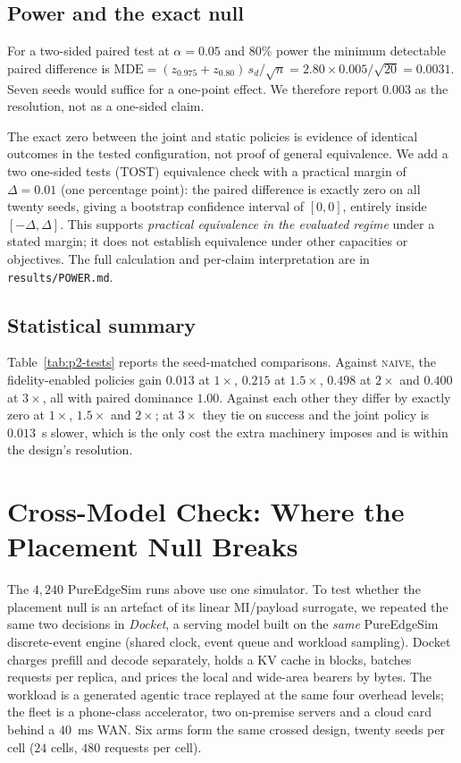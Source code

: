 \documentclass[journal,10pt]{IEEEtran}
\begin{document}


\subsection{Power and the exact null}
\label{sec:power}
For a two-sided paired test at $\alpha=0.05$ and $80\%$ power the minimum
detectable paired difference is
$\mathrm{MDE}=(z_{0.975}+z_{0.80})\,s_d/\sqrt{n}
=2.80\times0.005/\sqrt{20}=0.0031$. Seven seeds would suffice for a one-point
effect. We therefore report $0.003$ as the resolution, not as a one-sided claim.

The exact zero between the joint and static policies is evidence of identical
outcomes in the tested configuration, not proof of general equivalence. We add a
two one-sided tests (TOST) equivalence check with a practical margin of
$\Delta=0.01$ (one percentage point): the paired difference is exactly zero on
all twenty seeds, giving a bootstrap confidence interval of $[0,0]$, entirely
inside $[-\Delta,\Delta]$. This supports \emph{practical equivalence in the
evaluated regime} under a stated margin; it does not establish equivalence under
other capacities or objectives. The full calculation and per-claim interpretation
are in \texttt{results/POWER.md}.

\subsection{Statistical summary}


Table~\ref{tab:p2-tests} reports the seed-matched comparisons. Against
\textsc{naive}, the fidelity-enabled policies gain $0.013$ at $1\times$, $0.215$
at $1.5\times$, $0.498$ at $2\times$ and $0.400$ at $3\times$, all with paired
dominance $1.00$. Against each other they differ by exactly zero at $1\times$,
$1.5\times$ and $2\times$; at $3\times$ they tie on success and the joint policy
is $0.013$~s slower, which is the only cost the extra machinery imposes and is
within the design's resolution.

\section{Cross-Model Check: Where the Placement Null Breaks}
\label{sec:docket}
The $4{,}240$ PureEdgeSim runs above use one simulator. To test whether the placement
null is an artefact of its linear MI/payload surrogate, we repeated the same two
decisions in \emph{Docket}, a serving model built on the \emph{same} PureEdgeSim discrete-event engine (shared clock, event queue and workload sampling). Docket
charges prefill and decode separately, holds a KV cache in blocks, batches
requests per replica, and prices the local and wide-area bearers by bytes. The
workload is a generated agentic trace replayed at the same four overhead levels;
the fleet is a phone-class accelerator, two on-premise servers and a cloud card
behind a $40$~ms WAN. Six arms form the same crossed design, twenty seeds per
cell ($24$ cells, $480$ requests per cell).
\end{document}
